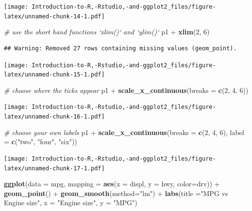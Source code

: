 \documentclass[]{book}
\newenvironment{Shaded}{\begin{snugshade}}{\end{snugshade}}
\newcommand{\KeywordTok}[1]{\textcolor[rgb]{0.13,0.29,0.53}{\textbf{{#1}}}}
\newcommand{\DataTypeTok}[1]{\textcolor[rgb]{0.13,0.29,0.53}{{#1}}}
\newcommand{\DecValTok}[1]{\textcolor[rgb]{0.00,0.00,0.81}{{#1}}}
\newcommand{\StringTok}[1]{\textcolor[rgb]{0.31,0.60,0.02}{{#1}}}
\newcommand{\CommentTok}[1]{\textcolor[rgb]{0.56,0.35,0.01}{\textit{{#1}}}}
\newcommand{\NormalTok}[1]{{#1}}
\begin{document}
\texttt{[image: Introduction-to-R,-Rstudio,-and-ggplot2\_files/figure-latex/unnamed-chunk-14-1.pdf]}

\begin{Shaded}
\begin{Highlighting}[]
\CommentTok{# use the short hand functions `xlim()` and `ylim()`}
\NormalTok{p1 +}\StringTok{ }\KeywordTok{xlim}\NormalTok{(}\DecValTok{2}\NormalTok{, }\DecValTok{6}\NormalTok{)}
\end{Highlighting}
\end{Shaded}

\begin{verbatim}
## Warning: Removed 27 rows containing missing values (geom_point).
\end{verbatim}

\texttt{[image: Introduction-to-R,-Rstudio,-and-ggplot2\_files/figure-latex/unnamed-chunk-15-1.pdf]}

\begin{Shaded}
\begin{Highlighting}[]
\CommentTok{#  choose where the ticks appear}
\NormalTok{p1 +}\StringTok{ }\KeywordTok{scale_x_continuous}\NormalTok{(}\DataTypeTok{breaks =} \KeywordTok{c}\NormalTok{(}\DecValTok{2}\NormalTok{, }\DecValTok{4}\NormalTok{, }\DecValTok{6}\NormalTok{))}
\end{Highlighting}
\end{Shaded}

\texttt{[image: Introduction-to-R,-Rstudio,-and-ggplot2\_files/figure-latex/unnamed-chunk-16-1.pdf]}

\begin{Shaded}
\begin{Highlighting}[]
\CommentTok{#  choose your own labels}
\NormalTok{p1 +}\StringTok{ }\KeywordTok{scale_x_continuous}\NormalTok{(}\DataTypeTok{breaks =} \KeywordTok{c}\NormalTok{(}\DecValTok{2}\NormalTok{, }\DecValTok{4}\NormalTok{, }\DecValTok{6}\NormalTok{), }\DataTypeTok{label =} \KeywordTok{c}\NormalTok{(}\StringTok{"two"}\NormalTok{, }\StringTok{"four"}\NormalTok{, }\StringTok{"six"}\NormalTok{))}
\end{Highlighting}
\end{Shaded}

\texttt{[image: Introduction-to-R,-Rstudio,-and-ggplot2\_files/figure-latex/unnamed-chunk-17-1.pdf]}

\begin{Shaded}
\begin{Highlighting}[]
\KeywordTok{ggplot}\NormalTok{(}\DataTypeTok{data =} \NormalTok{mpg, }\DataTypeTok{mapping =} \KeywordTok{aes}\NormalTok{(}\DataTypeTok{x =} \NormalTok{displ, }\DataTypeTok{y =} \NormalTok{hwy, }\DataTypeTok{color=}\NormalTok{drv)) +}\StringTok{ }\KeywordTok{geom_point}\NormalTok{() +}\StringTok{ }\KeywordTok{geom_smooth}\NormalTok{(}\DataTypeTok{method=}\StringTok{"lm"}\NormalTok{) +}\StringTok{ }\KeywordTok{labs}\NormalTok{(}\DataTypeTok{title =}\StringTok{"MPG vs Engine size"}\NormalTok{, }\DataTypeTok{x =} \StringTok{"Engine size"}\NormalTok{, }\DataTypeTok{y =} \StringTok{"MPG"}\NormalTok{)}
\end{Highlighting}
\end{Shaded}
\end{document}

